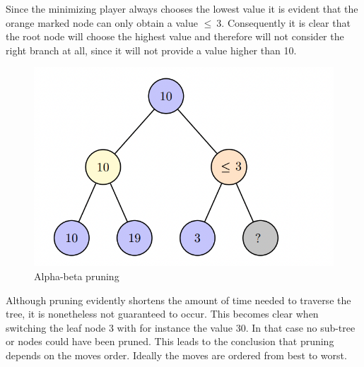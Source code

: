 \documentclass[conference,pdf,table,xcdraw, utf8]{IEEEtran}
\begin{document}

Since the minimizing player always chooses the lowest value it is evident that the orange marked node can only obtain a value  $\leq \ $3. Consequently it is clear that the root node will choose the highest value and therefore will not consider the right branch at all, since it will not provide a value higher than 10.

\begin{figure}[H]
    \centering
    \includegraphics[scale=0.35]{images/pruning_tree2.png}
    \caption{Alpha-beta pruning}
    \label{figure:pruning2}
\end{figure}

%         

Although pruning evidently shortens the amount of time needed to traverse the tree, it is nonetheless not guaranteed to occur. This becomes clear when switching the leaf node 3 with for instance the value 30. In that case no sub-tree or nodes could have been pruned. This leads to the conclusion that pruning depends on the moves order. Ideally the moves are ordered from best to worst.
\end{document}
